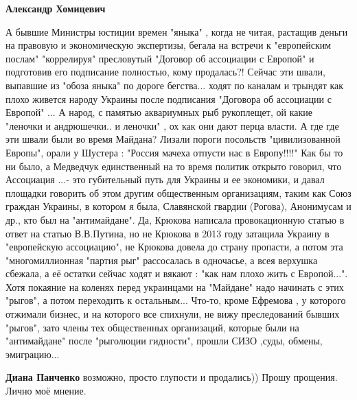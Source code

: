 \begin{itemize}
\begin{itemize}
\textbf{Александр Хомицевич} 

А бывшие Министры юстиции времен "яныка" , когда не читая, растащив деньги на
правовую и экономическую экспертизы, бегала на встречи к "европейским послам"
"коррелируя" пресловутый "Договор об ассоциации с Европой" и подготовив его
подписание полностью, кому продалась?! Сейчас эти швали, выпавшие из "обоза
яныка" по дороге бегства... ходят по каналам и трындят как плохо живется народу
Украины после подписания "Договора об ассоциации с Европой" ... А народ, с
памятью аквариумных рыб рукоплещет, ой какие "леночки и андрюшечки.. и леночки"
, ох как они дают перца власти. А где где эти швали были во время Майдана?
Лизали пороги посольств "цивилизованной Европы", орали у Шустера : "Россия
мачеха отпусти нас в Европу!!!!" Как бы то ни было, а Медведчук единственный на
то время политик открыто говорил, что Ассоциация ...- это губительный путь для
Украины и ее экономики, и давал площадки говорить об этом другим общественным
организациям, таким как Союз граждан Украины, в котором я была, Славянской
гвардии (Рогова), Анонимусам и др., кто был на "антимайдане". Да, Крюкова
написала провокационную статью в ответ на статью В.В.Путина, но не Крюкова в
2013 году затащила Украину в "европейскую ассоциацию", не Крюкова довела до
страну пропасти, а потом эта "многомиллионная "партия рыг" рассосалась в
одночасье, а всея верхушка сбежала, а её остатки сейчас ходят и вякают : "как
нам плохо жить с Европой...". Хотя покаяние на коленях перед украинцами на
"Майдане" надо начинать с этих "рыгов", а потом переходить к остальным...
Что-то, кроме Ефремова , у которого отжимали бизнес, и на которого все
спихнули, не вижу преследований бывших "рыгов", зато члены тех общественных
организаций, которые были на "антимайдане" после "рыголюции гидности", прошли
СИЗО ,суды, обмены, эмиграцию...


 
\textbf{Диана Панченко} возможно, просто глупости и продались)) Прошу прощения. Лично моё мнение.

 

\end{itemize}
\end{itemize}
